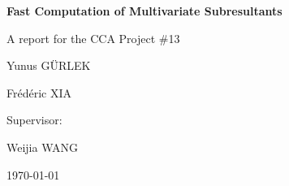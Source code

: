 \documentclass[12pt,a4paper]{article}
\begin{document}
\begin{titlepage}
    \centering
    \vspace*{5cm}
    {\Huge \textbf{Fast Computation of Multivariate Subresultants} \par}
    \vspace{0.5cm}
    {\Large A report for the CCA Project \#13 \par}
    \vspace{3cm}
    {\Large Yunus GÜRLEK \par}
    \vspace{0.5cm}
    {\Large Frédéric XIA \par}
    \vspace{1.5cm}
    {\large Supervisor:\par}
    \vspace{0.5cm}
    {\large Weijia WANG \par}
    \vfill
    {\large \today \par}
\end{titlepage}

\tableofcontents
\thispagestyle{empty}
\newpage








\newpage



\end{document}
